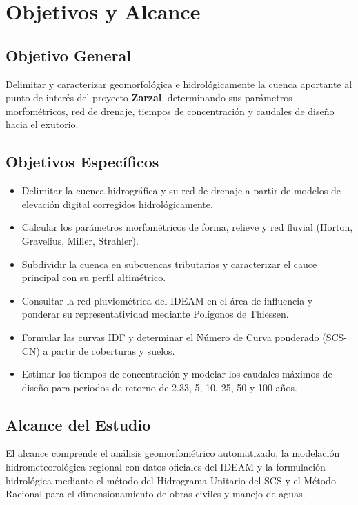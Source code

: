 \documentclass[11pt,a4paper]{article}
\begin{document}
\section{Objetivos y Alcance}

\subsection{Objetivo General}
Delimitar y caracterizar geomorfológica e hidrológicamente la cuenca aportante al punto de interés del proyecto \textbf{Zarzal}, determinando sus parámetros morfométricos, red de drenaje, tiempos de concentración y caudales de diseño hacia el exutorio.

\subsection{Objetivos Específicos}
\begin{itemize}
\item Delimitar la cuenca hidrográfica y su red de drenaje a partir de modelos de elevación digital corregidos hidrológicamente.
\item Calcular los parámetros morfométricos de forma, relieve y red fluvial (Horton, Gravelius, Miller, Strahler).
\item Subdividir la cuenca en subcuencas tributarias y caracterizar el cauce principal con su perfil altimétrico.
\item Consultar la red pluviométrica del IDEAM en el área de influencia y ponderar su representatividad mediante Polígonos de Thiessen.
\item Formular las curvas IDF y determinar el Número de Curva ponderado (SCS-CN) a partir de coberturas y suelos.
\item Estimar los tiempos de concentración y modelar los caudales máximos de diseño para periodos de retorno de 2.33, 5, 10, 25, 50 y 100 años.
\end{itemize}

\subsection{Alcance del Estudio}
El alcance comprende el análisis geomorfométrico automatizado, la modelación hidrometeorológica regional con datos oficiales del IDEAM y la formulación hidrológica mediante el método del Hidrograma Unitario del SCS y el Método Racional para el dimensionamiento de obras civiles y manejo de aguas.
\end{document}
